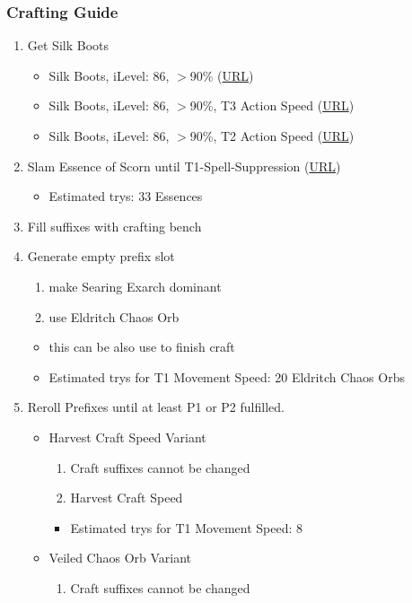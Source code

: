 \subsubsection{Crafting Guide}
\begin{enumerate}
	\item Get Silk Boots
	\begin{itemize}
		\item Silk Boots, iLevel: 86, $>$90\% (\url{URL})
		\item Silk Boots, iLevel: 86, $>$90\%, T3 Action Speed (\url{URL})
		\item Silk Boots, iLevel: 86, $>$90\%, T2 Action Speed (\url{URL})
	\end{itemize}
	\item Slam Essence of Scorn until T1-Spell-Suppression (\url{URL})
	\begin{itemize}
		\item Estimated trys: 33 Essences
	\end{itemize}
	\item Fill suffixes with crafting bench
	\item Generate empty prefix slot
	\begin{enumerate}
		\item make Searing Exarch dominant
		\item use Eldritch Chaos Orb
	\end{enumerate}
	\begin{itemize}
		\item this can be also use to finish craft
		\item Estimated trys for T1 Movement Speed: 20 Eldritch Chaos Orbs
	\end{itemize}
	\item Reroll Prefixes until at least P1 or P2 fulfilled.
	\begin{itemize}
		\item Harvest Craft Speed Variant
		\begin{enumerate}
			\item Craft suffixes cannot be changed
			\item Harvest Craft Speed
		\end{enumerate}
		\begin{itemize}
			\item Estimated trys for T1 Movement Speed: 8
		\end{itemize}
		\item Veiled Chaos Orb Variant
		\begin{enumerate}
			\item Craft suffixes cannot be changed

\end{enumerate}
\end{itemize}
\end{enumerate}
